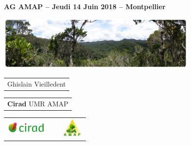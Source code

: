 {

  \begin{frame}[plain]
    \begin{center}
      \small{\textbf{AG AMAP -- Jeudi 14 Juin 2018 -- Montpellier}}
    \end{center}
    \vspace{-0.5cm}
    \titlepage %
    \vspace{-2.5cm}
    \begin{center}
      \includegraphics[width=10cm]{figs/Banniere.png}
    \end{center}
    \begin{center}

      {\footnotesize
        \begin{tabular}{c}
          Ghislain Vieilledent
        \end{tabular}
      }

      \vspace{0.25cm}

      {\scriptsize
        \begin{tabular}{c}
          \textbf{Cirad} UMR AMAP
        \end{tabular}
      }

      \vspace{0.25cm}

      \begin{tabular}{C{1cm}C{2cm}C{1cm}}
        \includegraphics[height=0.7cm]{figs/Logo-Cirad.png} &
        ~ &
	      \includegraphics[height=1.0cm]{figs/Logo-AMAP.png}
      \end{tabular}

    \end{center}
    
  \end{frame}
}


